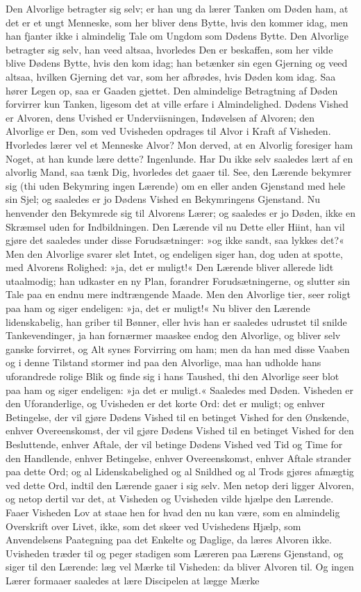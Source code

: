 \documentclass[12pt,a4paper]{article}
\begin{document}
Den Alvorlige betragter sig selv; er han ung da lærer Tanken om Døden ham, at det er et ungt Menneske, som her bliver dens Bytte, hvis den kommer idag, men han fjanter ikke i almindelig Tale om Ungdom som Dødens Bytte. Den Alvorlige betragter sig selv, han veed altsaa, hvorledes Den er beskaffen, som her vilde blive Dødens Bytte, hvis den kom idag; han betænker sin egen Gjerning og veed altsaa, hvilken Gjerning det var, som her afbrødes, hvis Døden kom idag. Saa hører Legen op, saa er Gaaden gjettet. Den almindelige Betragtning af Døden forvirrer kun Tanken, ligesom det at ville erfare i Almindelighed. Dødens Vished er Alvoren, dens Uvished er Underviisningen, Indøvelsen af Alvoren; den Alvorlige er Den, som ved Uvisheden opdrages til Alvor i Kraft af Visheden. Hvorledes lærer vel et Menneske Alvor? Mon derved, at en Alvorlig foresiger ham Noget, at han kunde lære dette? Ingenlunde. Har Du ikke selv saaledes lært af en alvorlig Mand, saa tænk Dig, hvorledes det gaaer til. See, den Lærende bekymrer sig (thi uden Bekymring ingen Lærende) om en eller anden Gjenstand med hele sin Sjel; og saaledes er jo Dødens Vished en Bekymringens Gjenstand. Nu henvender den Bekymrede sig til Alvorens Lærer; og saaledes er jo Døden, ikke en Skræmsel uden for Indbildningen. Den Lærende vil nu Dette eller Hiint, han vil gjøre det saaledes under disse Forudsætninger: »og ikke sandt, saa lykkes det?« Men den Alvorlige svarer slet Intet, og endeligen siger han, dog uden at spotte, med Alvorens Rolighed: »ja, det er muligt!« Den Lærende bliver allerede lidt utaalmodig; han udkaster en ny Plan, forandrer Forudsætningerne, og slutter sin Tale paa en endnu mere indtrængende Maade. Men den Alvorlige tier, seer roligt paa ham og siger endeligen: »ja, det er muligt!« Nu bliver den Lærende lidenskabelig, han griber til Bønner, eller hvis han er saaledes udrustet til snilde Tankevendinger, ja han fornærmer maaskee endog den Alvorlige, og bliver selv ganske forvirret, og Alt synes Forvirring om ham; men da han med disse Vaaben og i denne Tilstand stormer ind paa den Alvorlige, maa han udholde hans uforandrede rolige Blik og finde sig i hans Taushed, thi den Alvorlige seer blot paa ham og siger endeligen: »ja det er muligt.« Saaledes med Døden. Visheden er den Uforanderlige, og Uvisheden er det korte Ord: det er muligt; og enhver Betingelse, der vil gjøre Dødens Vished til en betinget Vished for den Ønskende, enhver Overeenskomst, der vil gjøre Dødens Vished til en betinget Vished for den Besluttende, enhver Aftale, der vil betinge Dødens Vished ved Tid og Time for den Handlende, enhver Betingelse, enhver Overeenskomst, enhver Aftale strander paa dette Ord; og al Lidenskabelighed og al Snildhed og al Trods gjøres afmægtig ved dette Ord, indtil den Lærende gaaer i sig selv. Men netop deri ligger Alvoren, og netop dertil var det, at Visheden og Uvisheden vilde hjælpe den Lærende. Faaer Visheden Lov at staae hen for hvad den nu kan være, som en almindelig Overskrift over Livet, ikke, som det skeer ved Uvishedens Hjælp, som Anvendelsens Paategning paa det Enkelte og Daglige, da læres Alvoren ikke. Uvisheden træder til og peger stadigen som Læreren paa Lærens Gjenstand, og siger til den Lærende: læg vel Mærke til Visheden: da bliver Alvoren til. Og ingen Lærer formaaer saaledes at lære Discipelen at lægge Mærke 
\end{document}
